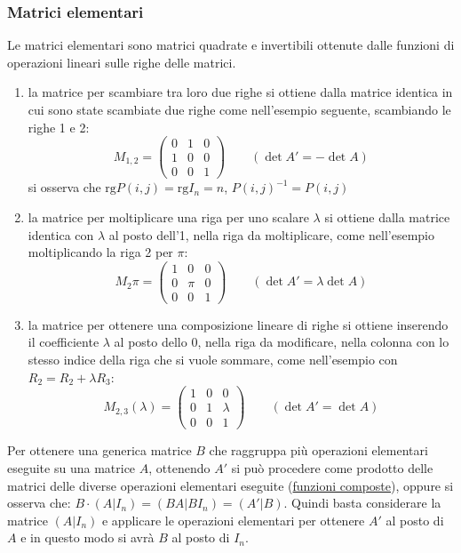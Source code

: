 \documentclass[a4paper]{article}
\newcommand\rg{\text{rg}} 		%
\begin{document}
\subsubsection*{Matrici elementari}
Le matrici elementari sono matrici quadrate e invertibili ottenute dalle funzioni di operazioni lineari sulle righe delle matrici.
\begin{enumerate}
	\item la matrice per scambiare tra loro due righe si ottiene dalla matrice identica in cui sono state scambiate due righe
	come nell'esempio seguente, scambiando le righe 1 e 2:
	\[M_{1,2} = \begin{pmatrix}
		0 & 1 & 0 \\
		1 & 0 & 0 \\
		0 & 0 & 1
	\end{pmatrix} \qquad (\det A' = -\det A)\]
	si osserva che \(\rg P(i,j) = \rg I_n = n\), \(P(i,j)^{-1} = P(i,j)\)
	
	\item la matrice per moltiplicare una riga per uno scalare \(\lambda\) si ottiene dalla matrice identica con \(\lambda\)
	al posto dell'1, nella riga da moltiplicare, come nell'esempio moltiplicando la riga 2 per \(\pi\):
	\[M_2\pi = \begin{pmatrix}
		1 & 0 & 0 \\
		0 & \pi & 0 \\
		0 & 0 & 1
	\end{pmatrix} \qquad (\det A' = \lambda \det A)\]
	
	\item la matrice per ottenere una composizione lineare di righe si ottiene inserendo il coefficiente \(\lambda\) al posto
	dello 0, nella riga da modificare, nella colonna con lo stesso indice della riga che si vuole sommare, come nell'esempio
	con \(R_2 = R_2 + \lambda R_3\):
	\[M_{2,3}(\lambda) = \begin{pmatrix}
		1 & 0 & 0 \\
		0 & 1 & \lambda \\
		0 & 0 & 1
	\end{pmatrix} \qquad (\det A' = \det A)\]
\end{enumerate}

Per ottenere una generica matrice \(B\) che raggruppa più operazioni elementari eseguite su una matrice \(A\), ottenendo \(A'\)
si può procedere come prodotto delle matrici delle diverse operazioni elementari eseguite (\hyperlink{composizioneFunzioniCambiamentiDiBase}{funzioni composte}),
oppure si osserva che: \(B \cdot (A|I_n) = (BA | BI_n) = (A'|B)\). Quindi basta considerare la matrice \((A|I_n)\) e applicare
le operazioni elementari per ottenere \(A'\) al posto di \(A\) e in questo modo si avrà \(B\) al posto di \(I_n\).
\end{document}
